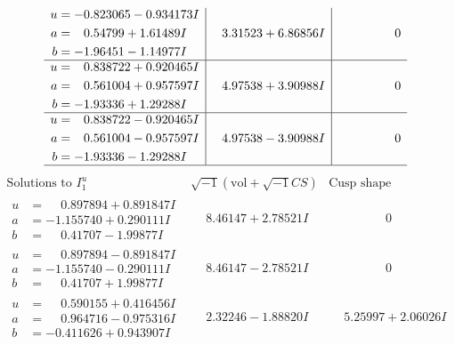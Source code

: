\documentclass[1p]{elsarticle_modified}
\theoremstyle{definition}
\newcommand{\I}{\sqrt{-1}}
\begin{document}
$$\begin{array}{c|c|c}
\begin{aligned}
u &= -0.823065 - 0.934173 I \\
a &= \phantom{-}0.54799 + 1.61489 I \\
b &= -1.96451 - 1.14977 I\end{aligned}
 & \phantom{-}3.31523 + 6.86856 I & \phantom{-0.000000 } 0 \\ \hline\begin{aligned}
u &= \phantom{-}0.838722 + 0.920465 I \\
a &= \phantom{-}0.561004 + 0.957597 I \\
b &= -1.93336 + 1.29288 I\end{aligned}
 & \phantom{-}4.97538 + 3.90988 I & \phantom{-0.000000 } 0 \\ \hline\begin{aligned}
u &= \phantom{-}0.838722 - 0.920465 I \\
a &= \phantom{-}0.561004 - 0.957597 I \\
b &= -1.93336 - 1.29288 I\end{aligned}
 & \phantom{-}4.97538 - 3.90988 I & \phantom{-0.000000 } 0\\
 \hline 
 \end{array}$$\newpage$$\begin{array}{c|c|c}  
\text{Solutions to }I^u_{1}& \I (\text{vol} + \sqrt{-1}CS) & \text{Cusp shape}\\
 \hline 
\begin{aligned}
u &= \phantom{-}0.897894 + 0.891847 I \\
a &= -1.155740 + 0.290111 I \\
b &= \phantom{-}0.41707 - 1.99877 I\end{aligned}
 & \phantom{-}8.46147 + 2.78521 I & \phantom{-0.000000 } 0 \\ \hline\begin{aligned}
u &= \phantom{-}0.897894 - 0.891847 I \\
a &= -1.155740 - 0.290111 I \\
b &= \phantom{-}0.41707 + 1.99877 I\end{aligned}
 & \phantom{-}8.46147 - 2.78521 I & \phantom{-0.000000 } 0 \\ \hline\begin{aligned}
u &= \phantom{-}0.590155 + 0.416456 I \\
a &= \phantom{-}0.964716 - 0.975316 I \\
b &= -0.411626 + 0.943907 I\end{aligned}
 & \phantom{-}2.32246 - 1.88820 I & \phantom{-}5.25997 + 2.06026 I \\ \hline\begin{aligned}

\end{aligned}
\end{array}$$
\end{document}
